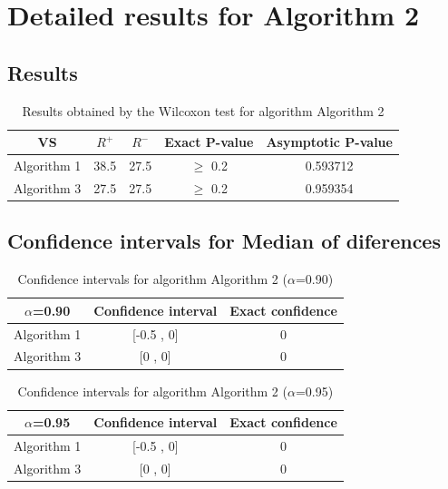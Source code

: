 \documentclass[a4paper,10pt]{article}
\begin{document}
 \clearpage 


\section{Detailed results for Algorithm 2}


\subsection{Results}

\begin{table}[!htp]
\centering\small
\begin{tabular}{
|c|c|c|c|c|}
\hline
 VS & $R^{+}$ & $R^{-}$ & Exact P-value & Asymptotic P-value \\ \hline 
Algorithm 1 & 38.5 & 27.5 & $\geq$ 0.2 & 0.593712\\ \hline 
Algorithm 3 & 27.5 & 27.5 & $\geq$ 0.2 & 0.959354\\ \hline 

\end{tabular}
\caption{Results obtained by the Wilcoxon test for algorithm Algorithm 2}
\end{table}

\subsection{Confidence intervals for Median of diferences}

\begin{table}[!htp]
\centering\small
\begin{tabular}{
|c|c|c|}
\hline
 $\alpha$=0.90 & Confidence interval & Exact confidence \\ \hline 
Algorithm 1 & [-0.5 , 0] & 0\\ \hline 
Algorithm 3 & [0 , 0] & 0\\ \hline 

\end{tabular}
\caption{Confidence intervals for algorithm Algorithm 2 ($\alpha$=0.90)}
\end{table}
\begin{table}[!htp]
\centering\small
\begin{tabular}{
|c|c|c|}
\hline
 $\alpha$=0.95 & Confidence interval & Exact confidence \\ \hline 
Algorithm 1 & [-0.5 , 0] & 0\\ \hline 
Algorithm 3 & [0 , 0] & 0\\ \hline 

\end{tabular}
\caption{Confidence intervals for algorithm Algorithm 2 ($\alpha$=0.95)}
\end{table}
\end{document}
